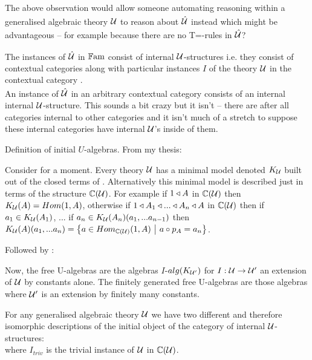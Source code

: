 \begin{notebox}[Question]
The above observation would allow someone automating reasoning within  a generalised algebraic theory 
$\gatU$ to reason about $\hatU$ instead which might be advantageous -- 
for example because there are no T=-rules in  $\hatU$?
\end{notebox}

\note 
The instances of $\hatU$  in $\Fam$ consist of  internal $\gat[U]$-structures  i.e. they consist of contextual categories \catcw along with particular instances $I$ of
the theory $\gat[U]$ in the contextual category \catc. \\
\note
An instance of $\hatU$ in an arbitrary contextual category
consists of  an internal internal $\gat[U]$-structure. This sounds a bit crazy but it isn't -- there are after all categories internal to other categories and it isn't much of a stretch to suppose these internal categories have internal $\gat[U]$'s inside of them. 

\note 
Definition of initial $U$-algebras. From my thesis:
\begin{tightquote}
Consider for a moment. Every theory $\gat[U]$ has a minimal model denoted $\KU$ built out of the closed terms of \gat[U]. Alternatively this minimal model is described just in terms of the structure $\CofU$. For example
if $1 \base A$ in $\CofU$ then 
$\KU(A)=Hom(1,A)$, otherwise if $1 \base A_1 \base ... \base A_n \base A$ in $\CofU$
then if $a_1 \in \KU(A_1)$, ... if $a_n \in \KU(A_n)(a_1,...a_{n-1})$ then 
$\KU(A)(a_1,...a_n)=\setsuchthat{a\in Hom_{\CofU}(1,A)}{a \circ p_A = a_n}$. \\
\end{tightquote} 

Followed by :
\begin{tightquote}
Now, the free U-algebras are the algebras $I$-$alg(\KUp)$ for $I: \gat[U] \morph \gat[U']$ an extension of $\gat[U]$ by constants alone. The finitely generated free U-algebras are those algebras where $\gat[U']$ is an extension by finitely many constants. \\
\end{tightquote}

\note
\label{termmodelEQfreealgebra}For any generalised algebraic theory $\gat[U]$ we have two different 
and therefore isomorphic descriptions of the initial object of the category of internal $\gatU$-structures:\\
where $I_{triv}$ is the trivial instance of $\gatU$ in $\CofU$.

